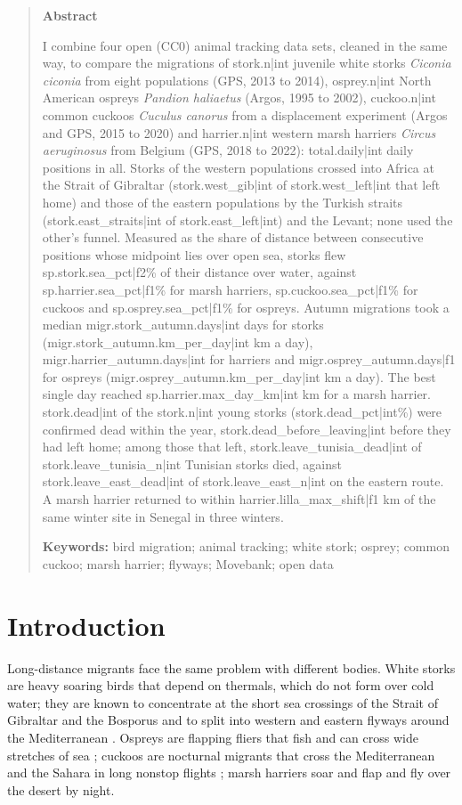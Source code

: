 \documentclass[11pt,a4paper]{article}
\begin{document}
\begin{quote}
\small
\begin{center}\textbf{Abstract}\end{center}
I combine four open (CC0) animal tracking data sets, cleaned in the same way, to compare the migrations of {{stork.n|int}} juvenile white storks \textit{Ciconia ciconia} from eight populations (GPS, 2013 to 2014), {{osprey.n|int}} North American ospreys \textit{Pandion haliaetus} (Argos, 1995 to 2002), {{cuckoo.n|int}} common cuckoos \textit{Cuculus canorus} from a displacement experiment (Argos and GPS, 2015 to 2020) and {{harrier.n|int}} western marsh harriers \textit{Circus aeruginosus} from Belgium (GPS, 2018 to 2022): {{total.daily|int}} daily positions in all. Storks of the western populations crossed into Africa at the Strait of Gibraltar ({{stork.west_gib|int}} of {{stork.west_left|int}} that left home) and those of the eastern populations by the Turkish straits ({{stork.east_straits|int}} of {{stork.east_left|int}}) and the Levant; none used the other's funnel. Measured as the share of distance between consecutive positions whose midpoint lies over open sea, storks flew {{sp.stork.sea_pct|f2}}\% of their distance over water, against {{sp.harrier.sea_pct|f1}}\% for marsh harriers, {{sp.cuckoo.sea_pct|f1}}\% for cuckoos and {{sp.osprey.sea_pct|f1}}\% for ospreys. Autumn migrations took a median {{migr.stork_autumn.days|int}} days for storks ({{migr.stork_autumn.km_per_day|int}} km a day), {{migr.harrier_autumn.days|int}} for harriers and {{migr.osprey_autumn.days|f1}} for ospreys ({{migr.osprey_autumn.km_per_day|int}} km a day). The best single day reached {{sp.harrier.max_day_km|int}} km for a marsh harrier. {{stork.dead|int}} of the {{stork.n|int}} young storks ({{stork.dead_pct|int}}\%) were confirmed dead within the year, {{stork.dead_before_leaving|int}} before they had left home; among those that left, {{stork.leave_tunisia_dead|int}} of {{stork.leave_tunisia_n|int}} Tunisian storks died, against {{stork.leave_east_dead|int}} of {{stork.leave_east_n|int}} on the eastern route. A marsh harrier returned to within {{harrier.lilla_max_shift|f1}} km of the same winter site in Senegal in three winters.

\textbf{Keywords:} bird migration; animal tracking; white stork; osprey; common cuckoo; marsh harrier; flyways; Movebank; open data
\end{quote}

\section{Introduction}
Long-distance migrants face the same problem with different bodies. White storks are heavy soaring birds that depend on thermals, which do not form over cold water; they are known to concentrate at the short sea crossings of the Strait of Gibraltar and the Bosporus and to split into western and eastern flyways around the Mediterranean \citep{flack2016}. Ospreys are flapping fliers that fish and can cross wide stretches of sea \citep{martell2001}; cuckoos are nocturnal migrants that cross the Mediterranean and the Sahara in long nonstop flights \citep{thorup2020}; marsh harriers soar and flap and fly over the desert by night.
\end{document}
